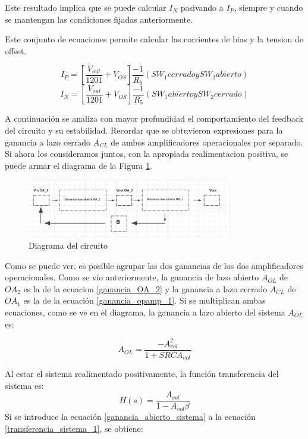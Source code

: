 Este resultado implica que se puede calcular $I_N$ pasivando a $I_P$, siempre y cuando se mantengan las condiciones fijadas anteriormente.

Este conjunto de ecuaciones permite calcular las corrientes de bias y la tension de offset.

\begin{equation} I_{P} = [\frac{V_{out}}{1201} + V_{OS}] \frac{-1}{R_6} (SW_1 cerrado y SW_2 abierto)\label{ecuacion_Ip}\end{equation}
\begin{equation} I_{N} = [\frac{V_{out}}{1201} + V_{OS}] \frac{-1}{R_5} (SW_1 abierto y SW_2 cerrado)\label{ecuacion_In}\end{equation}


A continuación se analiza con mayor profundidad el comportamiento del feedback del circuito y su estabilidad. Recordar que se obtuvieron expresiones para la ganancia a lazo cerrado $A_{CL}$ de ambos amplificadores operacionales 
por separado. Si ahora los consideramos juntos, con la apropiada realimentacion positiva, se puede armar el diagrama de la Figura \ref{diagrama}.

\begin{figure}[h!]                                                       
    \centering\includegraphics[width=0.8\textwidth]{../Ex3/Figuras/diagrama.png}
     \caption{Diagrama del circuito}
     \label{diagrama}
     \end{figure}

Como se puede ver, es posible agrupar las dos ganancias de los dos amplificadores operacionales. Como se vio anteriormente, la ganancia de lazo abierto $A_{OL}$ de $OA_2$ es la de la ecuacion \ref{ganancia_OA_2} y la ganancia a lazo
cerrado $A_{CL}$ de $OA_1$ es la de la ecuación \ref{ganancia_opamp_1}. Si se multiplican ambas ecuaciones, como se ve en el diagrama, la ganancia a lazo abierto del sistema $A_{OL}$ es:

\begin{equation} A_{OL}= \frac{-A_{vol}^2}{1+SRC A_{vol}}  \label{ganancia_abierto_sistema} \end{equation}

Al estar el sistema realimentado positivamente, la función transferencia del sistema es:  
\begin{equation} H (s) = \frac{A_{vol}}{1-A_{vol}\beta} \label{transferencia_sistema_1}  \end{equation}
Si se introduce la ecuación \ref{ganancia_abierto_sistema} a la ecuación \ref{transferencia_sistema_1}, se obtiene:

